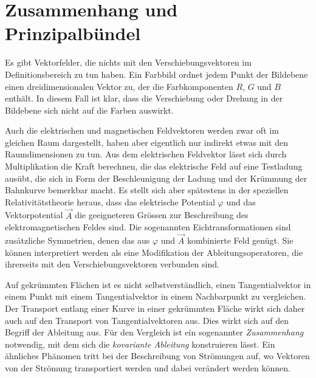 %
%
%

%
%
\section{Zusammenhang und Prinzipalbündel
\label{buch:fallstudie:prinzipalbuendel}}
%
Es gibt Vektorfelder, die nichts mit den Verschiebungsvektoren im
Definitionsbereich zu tun haben.
Ein Farbbild ordnet jedem Punkt der Bildebene einen dreidimensionalen
Vektor zu, der die Farbkomponenten $R$, $G$ und $B$ enthält.
In diesem Fall ist klar, dass die Verschiebung oder Drehung in der
Bildebene sich nicht auf die Farben auswirkt.

Auch die elektrischen und magnetischen Feldvektoren werden zwar
%
%
oft im gleichen Raum dargestellt, haben aber eigentlich nur indirekt
etwas mit den Raumdimensionen zu tun.
Aus dem elektrischen Feldvektor lässt sich durch Multiplikation die
Kraft berechnen, die das elektrische Feld auf eine Testladung ausübt,
die sich in Form der Beschleunigung der Ladung und der Krümmung der
Bahnkurve bemerkbar macht.
Es stellt sich aber spätestens in der speziellen Relativitätstheorie
heraus, dass das elektrische Potential $\varphi$ und das Vektorpotential
$\vec{A}$ die geeigneteren Grössen zur Beschreibung des elektromagnetischen
Feldes sind.
Die sogenannten Eichtransformationen sind zusätzliche Symmetrien, denen
%
das aus $\varphi$ und $\vec{A}$ kombinierte Feld genügt.
Sie können interpretiert werden als eine Modifikation der
Ableitungsoperatoren, die ihrerseits mit den Verschiebungsvektoren
verbunden sind.

Auf gekrümmten Flächen ist es nicht selbstverständlich, einen
Tangentialvektor in einem Punkt mit einem Tangentialvektor in einem
Nachbarpunkt zu vergleichen.
Der Transport entlang einer Kurve in einer gekrümmten Fläche wirkt
sich daher auch auf den Transport von Tangentialvektoren aus.
Dies wirkt sich auf den Begriff der Ableitung aus.
Für den Vergleich ist ein sogenannter {\em Zusammenhang} notwendig, mit
dem sich die {\em kovariante Ableitung} konstruieren lässt.
%
%
Ein ähnliches Phänomen tritt bei der Beschreibung von Strömungen
auf, wo Vektoren von der Strömung transportiert werden und dabei
verändert werden können.

%

